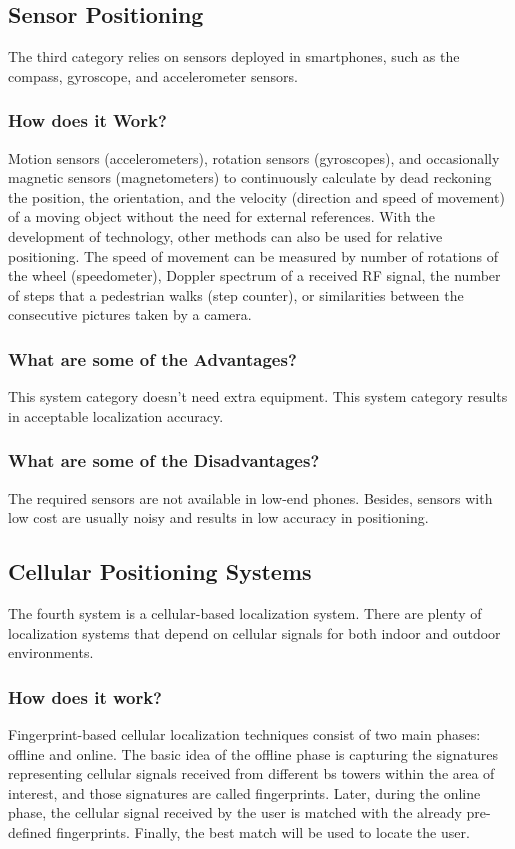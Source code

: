 \subsection{Sensor Positioning}
The third category relies on sensors deployed in smartphones, such as the compass, gyroscope, and accelerometer sensors.

\subsubsection{How does it Work?}
Motion sensors (accelerometers), rotation sensors (gyroscopes), and occasionally magnetic sensors (magnetometers) to continuously calculate by dead reckoning the position, the orientation, and the velocity (direction and speed of movement) of a moving object without the need for external references.
With the development of technology, other methods can also be used for relative positioning.
The speed of movement can be measured by number of rotations of the wheel (speedometer), Doppler spectrum of a received RF signal, the number of steps that a pedestrian walks (step counter), or similarities between the consecutive pictures taken by a camera.\cite{Ying19}

\subsubsection{What are some of the Advantages?}
This system category doesn't need extra equipment.
This system category results in acceptable localization accuracy.

\subsubsection{What are some of the Disadvantages?}
The required sensors are not available in low-end phones.
Besides, sensors with low cost are usually noisy and results in low accuracy in positioning.

\subsection{Cellular Positioning Systems}
The fourth system is a cellular-based localization system.
There are plenty of localization systems that depend on cellular signals for both indoor and outdoor environments.

\subsubsection{How does it work?}
Fingerprint-based cellular localization techniques consist of two main phases: offline and online\cite{6062428}.
The basic idea of the offline phase is capturing the signatures representing cellular signals received from different \ac{bs} towers within the area of interest, and those signatures are called fingerprints. Later, during the online phase, the cellular signal received by the user is matched with the already pre-defined fingerprints. Finally, the best match will be used to locate the user.

